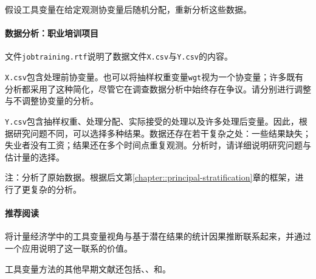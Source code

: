 假设工具变量在给定观测协变量后随机分配，重新分析这些数据。

 
 
 \paragraph{数据分析：职业培训项目}

文件\texttt{jobtraining.rtf}说明了数据文件\texttt{X.csv}与\texttt{Y.csv}的内容。 

\texttt{X.csv}包含处理前协变量。也可以将抽样权重变量\texttt{wgt}视为一个协变量；许多既有分析都采用了这种简化，尽管它在调查数据分析中始终存在争议。请分别进行调整与不调整协变量的分析。

\texttt{Y.csv}包含抽样权重、处理分配、实际接受的处理以及许多处理后变量。因此，根据研究问题不同，可以选择多种结果。数据还存在若干复杂之处：一些结果缺失；失业者没有工资；结果还在多个时间点重复观测。分析时，请详细说明研究问题与估计量的选择。 

注：\citet{schochet2008does}分析了原始数据。\citet{frumento2012evaluating}根据后文第\ref{chapter::principal-stratification}章的框架，进行了更复杂的分析。 


 \paragraph{推荐阅读}

\citet{angrist1996identification}将计量经济学中的工具变量视角与基于潜在结果的统计因果推断联系起来，并通过一个应用说明了这一联系的价值。 

工具变量方法的其他早期文献还包括\citet{permutt1989simultaneous}、\citet{sommer1991estimating}、\citet{baker1994paired}和\citet{cuzick1997adjusting}。 


